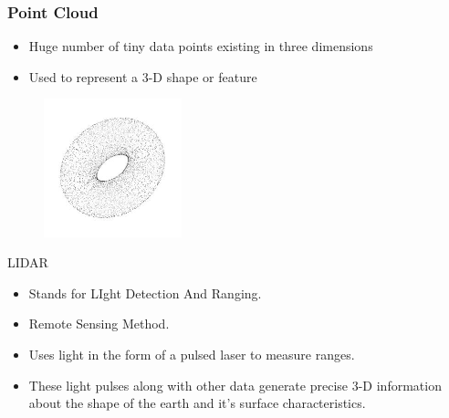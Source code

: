 \documentclass{beamer}
\begin{document}
\begin{frame}[fragile]
\frametitle{Point Cloud}
\begin{itemize}
\item Huge number of tiny data points existing in three dimensions
\item Used to represent a 3-D shape or feature
\end{itemize}
\begin{figure}
\includegraphics[width=4cm]{pc.png}
\end{figure}
\end{frame}

\begin{frame}[fragile]{LIDAR}
\begin{itemize}
\item Stands for LIght Detection And Ranging.
\item Remote Sensing Method.
\item Uses light in the form of a pulsed laser to measure ranges.
\item These light pulses along with other data generate precise 3-D information about the shape of the earth and it's surface characteristics.
\end{itemize}
\end{frame}

\end{document}
